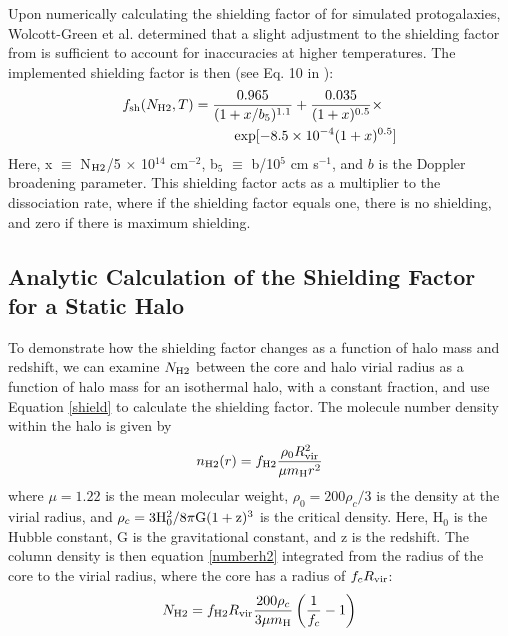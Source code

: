 \documentclass[fleqn,usenatbib]{mnras}
\begin{document}
Upon numerically calculating the shielding factor of \hh{} for simulated protogalaxies, Wolcott-Green et al. determined that a slight adjustment to the shielding factor from \citet{Draine96} is sufficient to account for inaccuracies at higher temperatures. The implemented shielding factor is then (see Eq. 10 in \citet{Wolcott11}):
\begin{equation} \label{shield}
	\begin{multlined}
	f_{\rm sh}(N_{\rm H2}, T) = \frac{0.965}{(1+x/b_{5})^{1.1}} + \frac{0.035}{(1+x)^{0.5}}  \times \\ \exp [-8.5 \times 10^{-4} (1+x)^{0.5}]
	\end{multlined}
\end{equation}
Here, x $\equiv$ N$_{\rm H2}$/5 $\times$ 10$^{14}$ cm$^{-2}$, b$_{5}$ $\equiv$ b/10$^{5}$ cm s$^{-1}$, and $b$ is the Doppler broadening parameter. This shielding factor acts as a multiplier to the \hh{} dissociation rate, where if the shielding factor equals one, there is no shielding, and zero if there is maximum shielding.

\subsection{Analytic Calculation of the Shielding Factor for a Static Halo}
To demonstrate how the shielding factor changes as a function of halo mass and redshift, we can examine $N_{\rm H2}$ between the core and halo virial radius as a function of halo mass for an isothermal halo, with a constant \hh{} fraction, and use Equation \ref{shield} to calculate the shielding factor. The \hh{} molecule number density within the halo is given by 
\begin{equation} \label{numberh2}
	n_{\rm H2}(r) = f_{\rm H2} \frac{\rho_{0}R^{2}_{\rm vir}}{\mu m_{\rm H} r^{2}}
\end{equation}
where $\mu = 1.22$ is the mean molecular weight, $\rho_{0} = 200 \rho_{c} / 3$ is the density at the virial radius, and $\rho_{c} = 3 \rm H_{0}^{2} / 8 \pi G (1+z)^3$ is the critical density. Here, H$_{0}$ is the Hubble constant, G is the gravitational constant, and z is the redshift. The column density is then equation \ref{numberh2} integrated from the radius of the core to the virial radius, where the core has a radius of $f_{c} R_{\rm vir}$: 
\begin{equation} \label{columnh2}
	N_{\rm H2} = f_{\rm H2} R_{\rm vir} \frac{200 \rho_{c}}{3 \mu m_{\rm H}} \left(\frac{1}{f_{c}} - 1 \right)
\end{equation}
\end{document}
